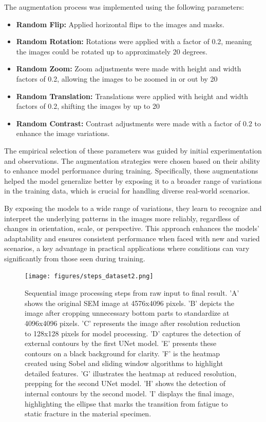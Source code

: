 \documentclass[preprint,12pt]{elsarticle}
\begin{document}
The augmentation process was implemented using the following parameters:
\begin{itemize}
    \item \textbf{Random Flip:} Applied horizontal flips to the images and masks.
    \item \textbf{Random Rotation:} Rotations were applied with a factor of 0.2, meaning the images could be rotated up to approximately 20 degrees.
    \item \textbf{Random Zoom:} Zoom adjustments were made with height and width factors of 0.2, allowing the images to be zoomed in or out by 20%
    \item \textbf{Random Translation:} Translations were applied with height and width factors of 0.2, shifting the images by up to 20%
    \item \textbf{Random Contrast:} Contrast adjustments were made with a factor of 0.2 to enhance the image variations.
\end{itemize}


The empirical selection of these parameters was guided by initial experimentation and observations. The augmentation strategies were chosen based on their ability to enhance model performance during training. Specifically, these augmentations helped the model generalize better by exposing it to a broader range of variations in the training data, which is crucial for handling diverse real-world scenarios.

By exposing the models to a wide range of variations, they learn to recognize and interpret the underlying patterns in the images more reliably, regardless of changes in orientation, scale, or perspective. This approach enhances the models' adaptability and ensures consistent performance when faced with new and varied scenarios, a key advantage in practical applications where conditions can vary significantly from those seen during training.

\begin{figure}[t!]
  \centering
  \begin{minipage}{1\textwidth}
    \centering
    \texttt{[image: figures/steps\_dataset2.png]}
    \caption{Sequential image processing steps from raw input to final result. 'A' shows the original SEM image at 4576x4096 pixels. 'B' depicts the image after cropping unnecessary bottom parts to standardize at 4096x4096 pixels. 'C' represents the image after resolution reduction to 128x128 pixels for model processing. 'D' captures the detection of external contours by the first UNet model. 'E' presents these contours on a black background for clarity. 'F' is the heatmap created using Sobel and sliding window algorithms to highlight detailed features. 'G' illustrates the heatmap at reduced resolution, prepping for the second UNet model. 'H' shows the detection of internal contours by the second model. 'I' displays the final image, highlighting the ellipse that marks the transition from fatigue to static fracture in the material specimen.}
    \label{steps}
  \end{minipage}
\end{figure}
\end{document}
